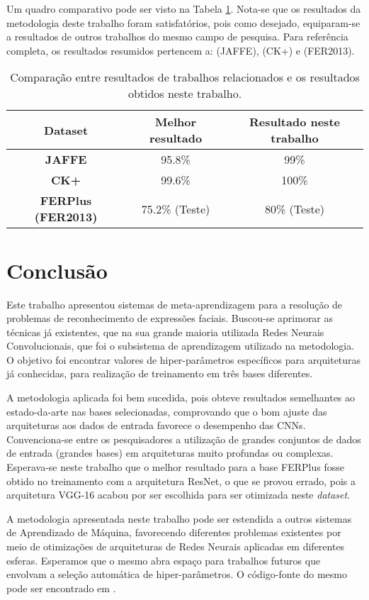 \documentclass[
12pt,       %
openright,      %
oneside,      %
a4paper,      %
english,      %
french,       %
spanish,      %
brazil        %
]{abntex2}
\begin{document}
Um quadro comparativo pode ser visto na Tabela \ref{tab:comparacao-resultados}. Nota-se que os resultados da metodologia deste trabalho foram satisfatórios, pois como desejado, equiparam-se a resultados de outros trabalhos do mesmo campo de pesquisa. Para referência completa, os resultados resumidos pertencem a: \cite{hamester2015} (JAFFE), \cite{Yu2017DeeperCP} (CK+) e \cite{pramerdorfer2016facial} (FER2013).

\begin{table}[H]
\centering
\caption{Comparação entre resultados de trabalhos relacionados e os resultados obtidos neste trabalho.}
\label{tab:comparacao-resultados}
\begin{tabular}{@{}ccc@{}}
\toprule
\textbf{Dataset} & \textbf{Melhor resultado} & \textbf{Resultado neste trabalho} \\ \midrule
\textbf{JAFFE}   & 95.8\%                    & 99\%                              \\
\textbf{CK+}     & 99.6\%                    & 100\%                             \\
\textbf{FERPlus (FER2013)} & 75.2\% (Teste)            & 80\% (Teste)                      \\ \bottomrule
\end{tabular}
\end{table}

\chapter{Conclusão} \label{conclusao}

Este trabalho apresentou sistemas de meta-aprendizagem para a resolução de problemas de reconhecimento de expressões faciais. Buscou-se aprimorar as técnicas já existentes, que na sua grande maioria utilizada Redes Neurais Convolucionais, que foi o subsistema de aprendizagem utilizado na metodologia. O objetivo foi encontrar valores de hiper-parâmetros específicos para arquiteturas já conhecidas, para realização de treinamento em três bases diferentes.

A metodologia aplicada foi bem sucedida, pois obteve resultados semelhantes ao estado-da-arte nas bases selecionadas, comprovando que o bom ajuste das arquiteturas aos dados de entrada favorece o desempenho das CNNs. Convenciona-se entre os pesquisadores a utilização de grandes conjuntos de dados de entrada (grandes bases) em arquiteturas muito profundas ou complexas. Esperava-se neste trabalho que o melhor resultado para a base FERPlus fosse obtido no treinamento com a arquitetura ResNet, o que se provou errado, pois a arquitetura VGG-16 acabou por ser escolhida para ser otimizada neste \textit{dataset}.

A metodologia apresentada neste trabalho pode ser estendida a outros sistemas de Aprendizado de Máquina, favorecendo diferentes problemas existentes por meio de otimizações de arquiteturas de Redes Neurais aplicadas em diferentes esferas. Esperamos que o mesmo abra espaço para trabalhos futuros que envolvam a seleção automática de hiper-parâmetros. O código-fonte do mesmo pode ser encontrado em .


\postextual


\end{document}
